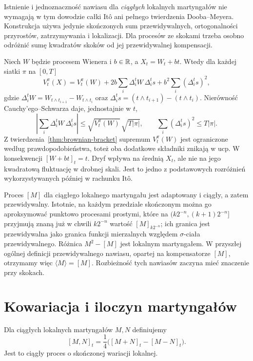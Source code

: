 \begin{uwaga}
Istnienie i jednoznaczność nawiasu dla \emph{ciągłych}
lokalnych martyngałów nie wymagają w tym dowodzie
całki Itô ani pełnego twierdzenia Dooba--Meyera.
Konstrukcja używa jedynie skończonych sum przewidywalnych,
ortogonalności przyrostów, zatrzymywania i lokalizacji.
Dla procesów ze skokami trzeba osobno odróżnić sumę
kwadratów skoków od jej przewidywalnej kompensacji.
\end{uwaga}


\begin{przyklad}
Niech $W$ będzie procesem Wienera i $b\in\mathbb{R}$, a
$X_t=W_t+bt$. Wtedy dla każdej siatki $\pi$ na $[0,T]$
\[
V_t^\pi(X)=V_t^\pi(W)
 +2b\sum_i\Delta_i^tW\,\Delta_i^t s
 +b^2\sum_i(\Delta_i^t s)^2,
\]
gdzie $\Delta_i^tW=W_{t\wedge t_{i+1}}-W_{t\wedge t_i}$
oraz $\Delta_i^t s=(t\wedge t_{i+1})-(t\wedge t_i)$.
Nierówność Cauchy'ego--Schwarza daje, jednostajnie w $t$,
\[
\left|\sum_i\Delta_i^tW\,\Delta_i^t s\right|
\le \sqrt{V_t^\pi(W)}\,\sqrt{T|\pi|},\qquad
\sum_i(\Delta_i^t s)^2\le T|\pi|.
\]
Z twierdzenia~\ref{thm:brownian-bracket} supremum $V_t^\pi(W)$
jest ograniczone według prawdopodobieństwa, toteż oba dodatkowe
składniki znikają w ucp. W konsekwencji $[W+bt]_t=t$.
Dryf wpływa na średnią $X_t$, ale nie na jego kwadratową
fluktuację w drobnej skali. Jest to jedno z podstawowych
rozróżnień wykorzystywanych później w rachunku It\^o.
\end{przyklad}

\begin{uwaga}
Proces $[M]$ dla ciągłego lokalnego martyngału jest adaptowany
i ciągły, a zatem przewidywalny. Istotnie, na każdym przedziale
skończonym można go aproksymować punktowo procesami prostymi,
które na $(k2^{-n},(k+1)2^{-n}]$ przyjmują znaną już w chwili
$k2^{-n}$ wartość $[M]_{k2^{-n}}$; ich granica jest
przewidywalna jako granica funkcji mierzalnych względem
$\sigma$-ciała przewidywalnego. Różnica $M^2-[M]$
jest lokalnym martyngałem. W przyszłej ogólnej definicji
przewidywalnego nawiasu, opartej na kompensatorze $[M]$,
otrzymamy więc $\langle M\rangle=[M]$.
Rozbieżność tych nawiasów zaczyna mieć znaczenie przy skokach.
\end{uwaga}


\section{Kowariacja i iloczyn martyngałów}
\begin{definicja}[Kowariacja]
Dla ciągłych lokalnych martyngałów $M,N$ definiujemy
\[
[M,N]_t=\frac14\bigl([M+N]_t-[M-N]_t\bigr).
\]
Jest to ciągły proces o skończonej wariacji lokalnej.
\end{definicja}

